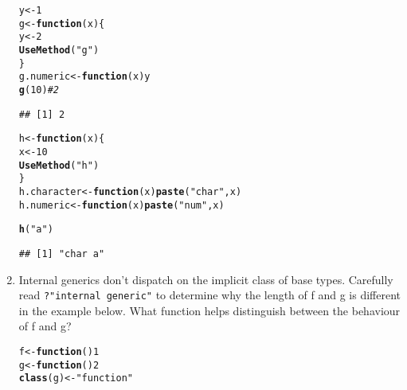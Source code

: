 \documentclass{article}\usepackage[]{graphicx}\usepackage[]{color}
\makeatletter
\newcommand{\hlnum}[1]{\textcolor[rgb]{0.686,0.059,0.569}{#1}}%
\newcommand{\hlstr}[1]{\textcolor[rgb]{0.192,0.494,0.8}{#1}}%
\newcommand{\hlcom}[1]{\textcolor[rgb]{0.678,0.584,0.686}{\textit{#1}}}%
\newcommand{\hlstd}[1]{\textcolor[rgb]{0.345,0.345,0.345}{#1}}%
\newcommand{\hlkwa}[1]{\textcolor[rgb]{0.161,0.373,0.58}{\textbf{#1}}}%
\newcommand{\hlkwb}[1]{\textcolor[rgb]{0.69,0.353,0.396}{#1}}%
\newcommand{\hlkwc}[1]{\textcolor[rgb]{0.333,0.667,0.333}{#1}}%
\newcommand{\hlkwd}[1]{\textcolor[rgb]{0.737,0.353,0.396}{\textbf{#1}}}%
\newenvironment{kframe}{%
 \def\at@end@of@kframe{}%
 \ifinner\ifhmode%
  \def\at@end@of@kframe{\end{minipage}}%
  \begin{minipage}{\columnwidth}%
 \fi\fi%
 \def\FrameCommand##1{\hskip\@totalleftmargin \hskip-\fboxsep
 \colorbox{shadecolor}{##1}\hskip-\fboxsep
     \hskip-\linewidth \hskip-\@totalleftmargin \hskip\columnwidth}%
 \MakeFramed {\advance\hsize-\width
   \@totalleftmargin\z@ \linewidth\hsize
   \@setminipage}}%
 {\par\unskip\endMakeFramed%
 \at@end@of@kframe}
\newenvironment{knitrout}{}{} %
\makeatother
\begin{document}
\begin{enumerate}
\begin{knitrout}
\color{fgcolor}\begin{kframe}
\begin{alltt}
\hlstd{y} \hlkwb{<-} \hlnum{1}
\hlstd{g} \hlkwb{<-} \hlkwa{function}\hlstd{(}\hlkwc{x}\hlstd{) \{}
  \hlstd{y} \hlkwb{<-} \hlnum{2}
  \hlkwd{UseMethod}\hlstd{(}\hlstr{"g"}\hlstd{)}
\hlstd{\}}
\hlstd{g.numeric} \hlkwb{<-} \hlkwa{function}\hlstd{(}\hlkwc{x}\hlstd{) y}
\hlkwd{g}\hlstd{(}\hlnum{10}\hlstd{)} \hlcom{# 2}
\end{alltt}
\begin{verbatim}
## [1] 2
\end{verbatim}
\begin{alltt}
\hlstd{h} \hlkwb{<-} \hlkwa{function}\hlstd{(}\hlkwc{x}\hlstd{) \{}
  \hlstd{x} \hlkwb{<-} \hlnum{10}
  \hlkwd{UseMethod}\hlstd{(}\hlstr{"h"}\hlstd{)}
\hlstd{\}}
\hlstd{h.character} \hlkwb{<-} \hlkwa{function}\hlstd{(}\hlkwc{x}\hlstd{)} \hlkwd{paste}\hlstd{(}\hlstr{"char"}\hlstd{, x)}
\hlstd{h.numeric} \hlkwb{<-} \hlkwa{function}\hlstd{(}\hlkwc{x}\hlstd{)} \hlkwd{paste}\hlstd{(}\hlstr{"num"}\hlstd{, x)}

\hlkwd{h}\hlstd{(}\hlstr{"a"}\hlstd{)}
\end{alltt}
\begin{verbatim}
## [1] "char a"
\end{verbatim}
\end{kframe}
\end{knitrout}

\item Internal generics don’t dispatch on the implicit class of base types. Carefully read \verb`?"internal generic"` to determine why the length of f and g is different in the example below. What function helps distinguish between the behaviour of f and g?

\begin{knitrout}
\color{fgcolor}\begin{kframe}
\begin{alltt}
\hlstd{f} \hlkwb{<-} \hlkwa{function}\hlstd{()} \hlnum{1}
\hlstd{g} \hlkwb{<-} \hlkwa{function}\hlstd{()} \hlnum{2}
\hlkwd{class}\hlstd{(g)} \hlkwb{<-} \hlstr{"function"}


\end{alltt}
\end{kframe}
\end{knitrout}
\end{enumerate}
\end{document}
